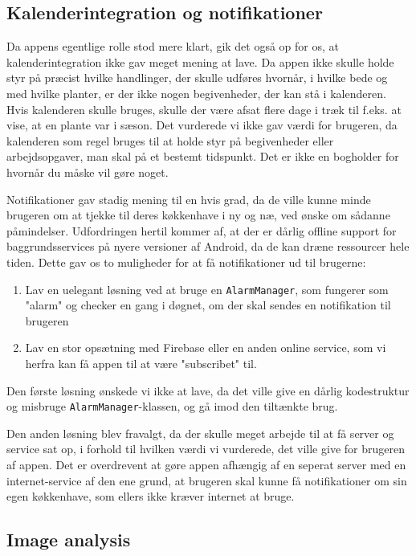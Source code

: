 \subsection{Kalenderintegration og notifikationer}
Da appens egentlige rolle stod mere klart, gik det også op for os, at kalenderintegration ikke gav meget mening at lave. Da appen ikke skulle holde styr på præcist hvilke handlinger, der skulle udføres hvornår, i hvilke bede og med hvilke planter, er der ikke nogen begivenheder, der kan stå i kalenderen. Hvis kalenderen skulle bruges, skulle der være afsat flere dage i træk til f.eks. at vise, at en plante var i sæson. Det vurderede vi ikke gav værdi for brugeren, da kalenderen som regel bruges til at holde styr på begivenheder eller arbejdsopgaver, man skal på et bestemt tidspunkt. Det er ikke en bogholder for hvornår du måske vil gøre noget.

Notifikationer gav stadig mening til en hvis grad, da de ville kunne minde brugeren om at tjekke til deres køkkenhave i ny og næ, ved ønske om sådanne påmindelser. Udfordringen hertil kommer af, at der er dårlig offline support for baggrundsservices på nyere versioner af Android, da de kan dræne ressourcer hele tiden. Dette gav os to muligheder for at få notifikationer ud til brugerne:

\begin{enumerate}
    \item Lav en uelegant løsning ved at bruge en \texttt{AlarmManager}, som fungerer som "alarm" og checker en gang i døgnet, om der skal sendes en notifikation til brugeren
    \item Lav en stor opsætning med Firebase eller en anden online service, som vi herfra kan få appen til at være "subscribet" til.
\end{enumerate}

Den første løsning ønskede vi ikke at lave, da det ville give en dårlig kodestruktur og misbruge \texttt{AlarmManager}-klassen, og gå imod den tiltænkte brug.

Den anden løsning blev fravalgt, da der skulle meget arbejde til at få server og service sat op, i forhold til hvilken værdi vi vurderede, det ville give for brugeren af appen. Det er overdrevent at gøre appen afhængig af en seperat server med en internet-service af den ene grund, at brugeren skal kunne få notifikationer om sin egen køkkenhave, som ellers ikke kræver internet at bruge.

\subsection{Image analysis}

